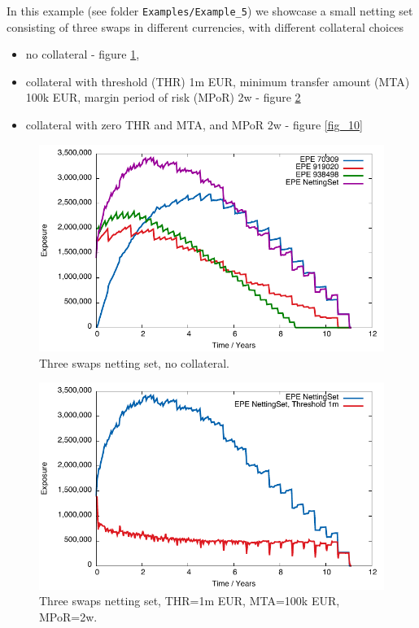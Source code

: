 \documentclass[12pt, a4paper]{article}
\begin{document}
In this example (see folder {\tt Examples/Example\_5}) we showcase a small netting set consisting of three swaps in different currencies, with different collateral choices
\begin{itemize}
\item no collateral - figure \ref{fig_8},
\item collateral with threshold (THR) 1m EUR, minimum transfer amount (MTA) 100k EUR, margin period of risk (MPoR) 2w - figure \ref{fig_9}
\item collateral with zero THR and MTA, and MPoR 2w - figure \ref{fig_10}
\end{itemize}
 
\begin{figure}[hbt]
\begin{center}
\includegraphics[scale=1.0]{example_nocollateral_epe.pdf}
\end{center}
\caption{Three swaps netting set, no collateral.}
\label{fig_8}
\end{figure}

\begin{figure}[hbt]
\begin{center}
\includegraphics[scale=1.0]{example_threshold_epe.pdf}
\end{center}
\caption{Three swaps netting set, THR=1m EUR, MTA=100k EUR, MPoR=2w.}
\label{fig_9}
\end{figure}
\end{document}
